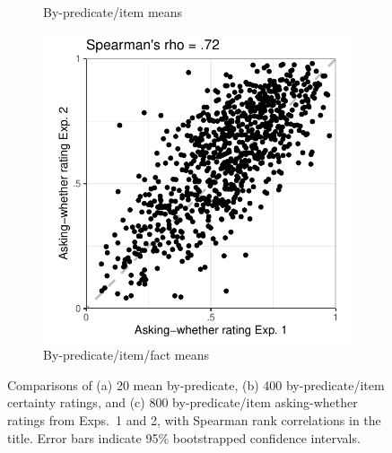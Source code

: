 \documentclass[11pt,fleqn]{article}
\newcommand{\6}{\mbox{$[\hspace*{-.6mm}[$}}
\newcommand{\9}{\mbox{$]\hspace*{-.6mm}]$}}
\begin{document}
\begin{figure}[h!]
\begin{subfigure}[t]{.3\textwidth}
\caption{By-predicate/item means}
\end{subfigure}\hfill
\begin{subfigure}[t]{.3\textwidth}
\centering
\includegraphics[width=\textwidth]{../../results/exp1/graphs/SUP-ai-PredItemFact-Exp1-by-Exp2}
\caption{By-predicate/item/fact means}
\end{subfigure}  
\caption{Comparisons of (a) 20 mean by-predicate, (b) 400 by-predicate/item certainty ratings, and (c) 800 by-predicate/item asking-whether ratings from Exps.~1 and 2,  with Spearman rank correlations in the title. Error bars indicate 95\% bootstrapped confidence intervals.}\label{fig:SUP-ai-comparison}
\end{figure}
\end{document}
